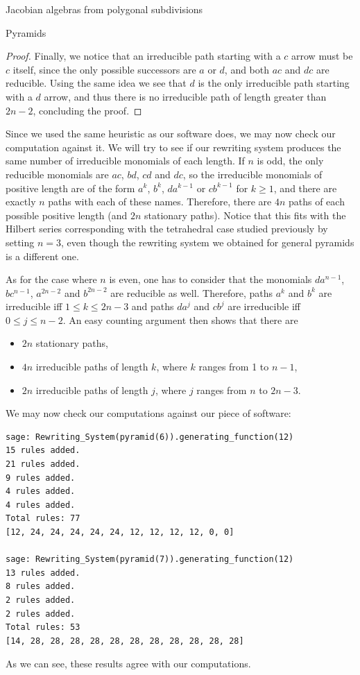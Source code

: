 \begin{chapter}{Jacobian algebras from polygonal subdivisions}
\begin{section}{Pyramids}
\begin{proof}
Finally, we notice that an irreducible path starting with a $c$ arrow must be $c$ itself, since the only possible successors are $a$ or $d$, and both $ac$ and $dc$ are reducible. Using the same idea we see that $d$ is the only irreducible path starting with a $d$ arrow, and thus there is no irreducible path of length greater than $2n-2$, concluding the proof.
\end{proof}
Since we used the same heuristic as our software does, we may now check our computation against it. We will try to see if our rewriting system produces the same number of irreducible monomials of each length. 
If $n$ is odd, the only reducible monomials are $ac$, $bd$, $cd$ and $dc$, so the irreducible monomials of positive length are of the form $a^k$, $b^k$, $da^{k-1}$ or $cb^{k-1}$ for $k\geq 1$, and there are exactly $n$ paths with each of these names. Therefore, there are $4n$ paths of each possible positive length (and $2n$ stationary paths).
Notice that this fits with the Hilbert series corresponding with the tetrahedral case studied previously by setting $n=3$, even though the rewriting system we obtained for general pyramids is a different one.

As for the case where $n$ is even, one has to consider that the monomials $da^{n-1}$, $bc^{n-1}$, $a^{2n-2}$ and $b^{2n-2}$ are reducible as well. Therefore, paths $a^k$ and $b^k$ are irreducible iff $1\leq k\leq 2n-3$ and paths $da^j$ and $cb^j$ are irreducible iff $0\leq j \leq n-2$. An easy counting argument then shows that there are
\begin{itemize}
\item $2n$ stationary paths,
\item $4n$ irreducible paths of length $k$, where $k$ ranges from 1 to $n-1$,
\item $2n$ irreducible paths of length $j$, where $j$ ranges from $n$ to $2n-3$.
\end{itemize}

We may now check our computations against our piece of software:
\begin{lstlisting}
sage: Rewriting_System(pyramid(6)).generating_function(12)
15 rules added.
21 rules added.
9 rules added.
4 rules added.
4 rules added.
Total rules: 77
[12, 24, 24, 24, 24, 24, 12, 12, 12, 12, 0, 0]

sage: Rewriting_System(pyramid(7)).generating_function(12)
13 rules added.
8 rules added.
2 rules added.
2 rules added.
Total rules: 53
[14, 28, 28, 28, 28, 28, 28, 28, 28, 28, 28, 28]
\end{lstlisting}
As we can see, these results agree with our computations.
\end{section}


\end{chapter}
